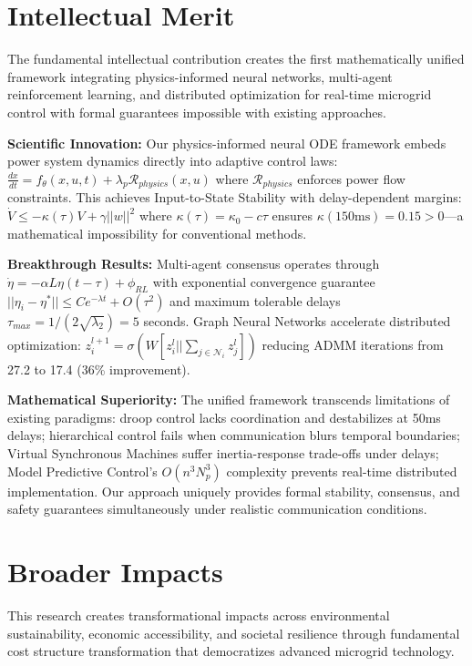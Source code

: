 \documentclass[12pt]{article}
\begin{document}
\section{Intellectual Merit}

The fundamental intellectual contribution creates the first mathematically unified framework integrating physics-informed neural networks, multi-agent reinforcement learning, and distributed optimization for real-time microgrid control with formal guarantees impossible with existing approaches.

\textbf{Scientific Innovation:} Our physics-informed neural ODE framework embeds power system dynamics directly into adaptive control laws: $\frac{dx}{dt} = f_\theta(x, u, t) + \lambda_p \mathcal{R}_{physics}(x, u)$ where $\mathcal{R}_{physics}$ enforces power flow constraints. This achieves Input-to-State Stability with delay-dependent margins: $\dot{V} \leq -\kappa(\tau)V + \gamma||w||^2$ where $\kappa(\tau) = \kappa_0 - c\tau$ ensures $\kappa(150\text{ms}) = 0.15 > 0$—a mathematical impossibility for conventional methods.

\textbf{Breakthrough Results:} Multi-agent consensus operates through $\dot{\eta} = -\alpha L \eta(t-\tau) + \phi_{RL}$ with exponential convergence guarantee $||\eta_i - \eta^*|| \leq Ce^{-\lambda t} + O(\tau^2)$ and maximum tolerable delays $\tau_{max} = 1/(2\sqrt{\lambda_2}) = 5$ seconds. Graph Neural Networks accelerate distributed optimization: $z_i^{l+1} = \sigma(W[z_i^l || \sum_{j \in \mathcal{N}_i} z_j^l])$ reducing ADMM iterations from 27.2 to 17.4 (36\% improvement).

\textbf{Mathematical Superiority:} The unified framework transcends limitations of existing paradigms: droop control lacks coordination and destabilizes at 50ms delays; hierarchical control fails when communication blurs temporal boundaries; Virtual Synchronous Machines suffer inertia-response trade-offs under delays; Model Predictive Control's $O(n^3N_p^3)$ complexity prevents real-time distributed implementation. Our approach uniquely provides formal stability, consensus, and safety guarantees simultaneously under realistic communication conditions.

\section{Broader Impacts}

This research creates transformational impacts across environmental sustainability, economic accessibility, and societal resilience through fundamental cost structure transformation that democratizes advanced microgrid technology.
\end{document}
